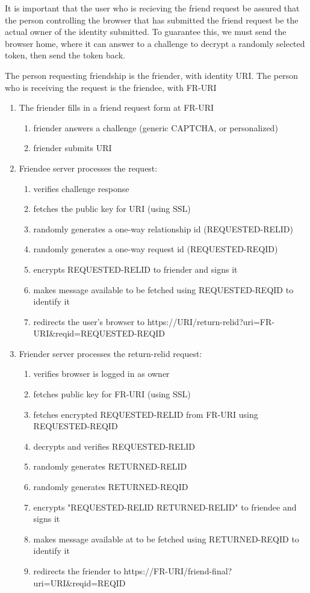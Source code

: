 \documentclass[letterpaper,11pt,oneside]{article}
\begin{document}
It is important that the user who is recieving the friend request be assured
that the person controlling the browser that has submitted the friend request
be the actual owner of the identity submitted. To guarantee this, we must send
the browser home, where it can answer to a challenge to decrypt a randomly
selected token, then send the token back.

The person requesting friendship is the friender, with identity URI. The person
who is receiving the request is the friendee, with FR-URI

\begin{enumerate}
\item The friender fills in a friend request form at FR-URI
    \begin{enumerate}
    \item friender answers a challenge (generic CAPTCHA, or personalized)
    \item friender submits URI
    \end{enumerate}

\item Friendee server processes the request:
    \begin{enumerate}
    \item verifies challenge response
    \item fetches the public key for URI (using SSL)
    \item randomly generates a one-way relationship id (REQUESTED-RELID)
    \item randomly generates a one-way request id (REQUESTED-REQID)
    \item encrypts REQUESTED-RELID to friender and signs it
    \item makes message available to be fetched using REQUESTED-REQID to identify it
    \item redirects the user's browser to https://URI/return-relid?uri=FR-URI\&reqid=REQUESTED-REQID
    \end{enumerate}

\item Friender server processes the return-relid request:
    \begin{enumerate}
    \item verifies browser is logged in as owner
    \item fetches public key for FR-URI (using SSL)
    \item fetches encrypted REQUESTED-RELID from FR-URI using REQUESTED-REQID
    \item decrypts and verifies REQUESTED-RELID
    \item randomly generates RETURNED-RELID
    \item randomly generates RETURNED-REQID
    \item encrypts "REQUESTED-RELID RETURNED-RELID" to friendee and signs it
    \item makes message available at to be fetched using RETURNED-REQID to identify it
    \item redirects the friender to https://FR-URI/friend-final?uri=URI\&reqid=REQID
    \end{enumerate}


\end{enumerate}
\end{document}
